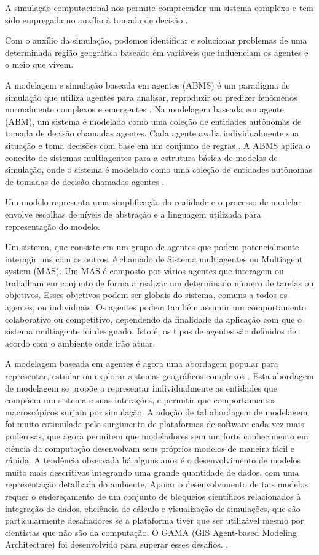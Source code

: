 A simulação computacional nos permite compreender um sistema complexo e tem sido empregada no auxílio à tomada de decisão \cite{Chung2003}.

Com o auxílio da simulação, podemos identificar e solucionar problemas de uma determinada região geográfica baseado em variáveis que influenciam os agentes e o meio que vivem. 

A modelagem e simulação baseada em agentes (ABMS) é um paradigma de simulação que utiliza agentes para analisar, reproduzir ou predizer fenômenos normalmente complexos e emergentes \cite{Klugl2012agent}. Na modelagem baseada em agente (ABM), um sistema é modelado como uma coleção de entidades autônomas de tomada de decisão chamadas agentes. Cada agente avalia individualmente sua situação e toma decisões com base em um conjunto de regras \cite{bonabeau2002agent}. A ABMS aplica o conceito de sistemas multiagentes para a estrutura básica de modelos de simulação, onde o sistema é modelado como
uma coleção de entidades autônomas de tomadas de decisão chamadas agentes \cite{macal2007agent}.

Um modelo representa uma simplificação da realidade e o processo de modelar envolve escolhas de níveis de abstração  e a linguagem utilizada para representação do modelo. 

Um sistema, que consiste em um grupo de agentes que podem potencialmente interagir uns com os outros, é chamado de Sistema multiagentes ou Multiagent system (MAS). Um MAS é composto por vários agentes que interagem ou trabalham em conjunto de forma a realizar um determinado número de tarefas ou objetivos. Esses objetivos podem ser globais do sistema, comuns a todos os agentes, ou individuais. Os agentes podem também assumir um comportamento colaborativo ou competitivo, dependendo da finalidade da aplicação com que o sistema multiagente foi designado.  Isto é, os tipos de agentes são definidos de acordo com o ambiente onde irão atuar. \cite{RosaSilvaMAS}

A modelagem baseada em agentes é agora uma abordagem popular para representar, estudar ou explorar sistemas geográficos complexos \cite{heppenstall2011agent}. Esta abordagem de modelagem se propõe a representar individualmente as entidades que compõem um sistema e suas interações, e permitir que  comportamentos macroscópicos surjam por simulação. A adoção de tal abordagem de modelagem foi muito estimulada pelo surgimento de plataformas de software cada vez mais poderosas, que agora permitem que modeladores sem um forte conhecimento em ciência da computação desenvolvam seus próprios modelos de maneira fácil e rápida. A tendência observada há alguns anos é o desenvolvimento de modelos muito mais descritivos integrando uma grande quantidade de dados, com uma representação detalhada do ambiente.
Apoiar o desenvolvimento de tais modelos requer o endereçamento de um conjunto de bloqueios científicos relacionados à integração de dados, eficiência de cálculo e visualização de simulações, que são particularmente desafiadores se a plataforma tiver que ser utilizável mesmo por cientistas que não são da computação. O GAMA (GIS Agent-based Modeling Architecture) foi desenvolvido para superar esses desafios. \cite{gamaplataform}.

